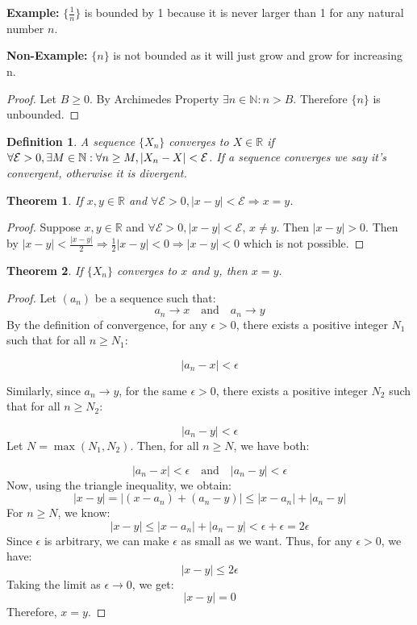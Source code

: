 \documentclass[12pt]{article}
\newtheorem{theorem}{Theorem}
\newtheorem{definition}{Definition}
\begin{document}
\noindent 
\textbf{Example:} \(\{\frac{1}{n}\}\) is bounded by 1 because it is never larger than 1 
for any natural number \(n\).

\noindent 
\textbf{Non-Example: } \(\{n\}\) is not bounded as it will just grow and grow 
for increasing n.
\begin{proof}
    Let \(B \geq 0\). By Archimedes Property \(\exists n \in \mathbb N : n > B\). 
    Therefore \(\{n\}\) is unbounded.
\end{proof}
\begin{definition}
    A sequence \(\{X_n\}\) converges to \(X \in \mathbb R\) if 
    \(\forall \mathcal E > 0, \exists M \in \mathbb N : 
    \forall n \geq M, \\ |X_n - X| < \mathcal E \).
    If a sequence converges we say it's convergent, otherwise it is divergent.
\end{definition}
\begin{theorem}
    If \(x,y \in \mathbb R\) and \(\forall \mathcal E > 0, |x-y| < \mathcal E \Rightarrow
    x = y\).
\end{theorem}
\begin{proof}
    Suppose \(x,y \in \mathbb R\) and \(\forall \mathcal E > 0, |x-y| < \mathcal E\), 
    \(x \neq y\). Then \(|x-y| > 0\). Then by \(|x-y| < \frac{|x-y|}{2} \Rightarrow 
    \frac{1}{2}|x-y| < 0 \Rightarrow |x-y| < 0\) which is not possible.
\end{proof}

\begin{theorem}
    If \(\{X_n\}\) converges to \(x\) and \(y\), then \(x = y\).
\end{theorem}
\begin{proof}
    Let \((a_n)\) be a sequence such that:
    \[
        a_n \to x \quad \text{and} \quad a_n \to y
    \]
    By the definition of convergence, for any \(\epsilon > 0\), there exists a positive integer \(N_1\) such that for all \(n \geq N_1\):

    \[
        |a_n - x| < \epsilon
    \]

    \noindent
    Similarly, since \(a_n \to y\), for the same \(\epsilon > 0\), there exists a positive integer \(N_2\) such that for all \(n \geq N_2\):

    \[
        |a_n - y| < \epsilon
    \]
\noindent 
    Let \(N = \max(N_1, N_2)\). Then, for all \(n \geq N\), we have both:

    \[
        |a_n - x| < \epsilon \quad \text{and} \quad |a_n - y| < \epsilon
    \]
    Now, using the triangle inequality, we obtain:
    \[
        |x - y| = |(x - a_n) + (a_n - y)| \leq |x - a_n| + |a_n - y|
    \]
    For \(n \geq N\), we know:
    \[
        |x - y| \leq |x - a_n| + |a_n - y| < \epsilon + \epsilon = 2\epsilon
    \]
    Since \(\epsilon\) is arbitrary, we can make \(\epsilon\) as small as we want. Thus, for any \(\epsilon > 0\), we have:
    \[
        |x - y| \leq 2\epsilon
    \]
    Taking the limit as \(\epsilon \to 0\), we get:
    \[
        |x - y| = 0
    \]
    Therefore, \(x = y\).


\end{proof}
\end{document}
